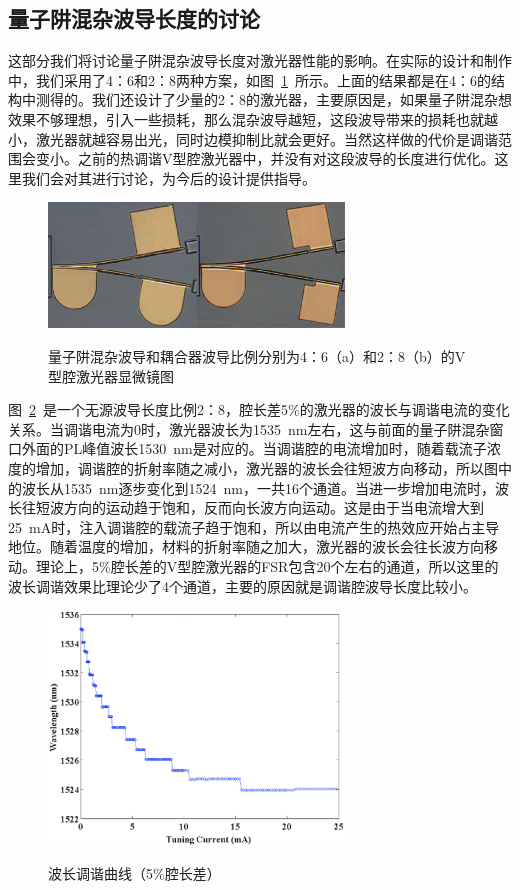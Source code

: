 \documentclass{ZJUthesis}
\begin{document}
\subsection{量子阱混杂波导长度的讨论}

这部分我们将讨论量子阱混杂波导长度对激光器性能的影响。在实际的设计和制作中，我们采用了4：6和2：8两种方案，如图~\ref{fig_20p}~所示。上面的结果都是在4：6的结构中测得的。我们还设计了少量的2：8的激光器，主要原因是，如果量子阱混杂想效果不够理想，引入一些损耗，那么混杂波导越短，这段波导带来的损耗也就越小，激光器就越容易出光，同时边模抑制比就会更好。当然这样做的代价是调谐范围会变小。之前的热调谐V型腔激光器中，并没有对这段波导的长度进行优化。这里我们会对其进行讨论，为今后的设计提供指导。

\begin{figure}[htbp]
  \centering
  \includegraphics[width=0.7\textwidth]{./Pictures/20p.eps}\\
  \caption{量子阱混杂波导和耦合器波导比例分别为4：6（a）和2：8（b）的V型腔激光器显微镜图}
  \label{fig_20p}
\end{figure}

图~\ref{fig_20p1}~是一个无源波导长度比例2：8，腔长差5\%的激光器的波长与调谐电流的变化关系。当调谐电流为0时，激光器波长为1535~nm左右，这与前面的量子阱混杂窗口外面的PL峰值波长1530~nm是对应的。当调谐腔的电流增加时，随着载流子浓度的增加，调谐腔的折射率随之减小，激光器的波长会往短波方向移动，所以图中的波长从1535~nm逐步变化到1524~nm，一共16个通道。当进一步增加电流时，波长往短波方向的运动趋于饱和，反而向长波方向运动。这是由于当电流增大到25~mA时，注入调谐腔的载流子趋于饱和，所以由电流产生的热效应开始占主导地位。随着温度的增加，材料的折射率随之加大，激光器的波长会往长波方向移动。理论上，5\%腔长差的V型腔激光器的FSR包含20个左右的通道，所以这里的波长调谐效果比理论少了4个通道，主要的原因就是调谐腔波导长度比较小。

\begin{figure}[htbp]
  \centering
  \includegraphics[width=0.7\textwidth]{./Pictures/20p1.eps}\\
  \caption{波长调谐曲线（5\%腔长差）}
  \label{fig_20p1}
\end{figure}
\end{document}
